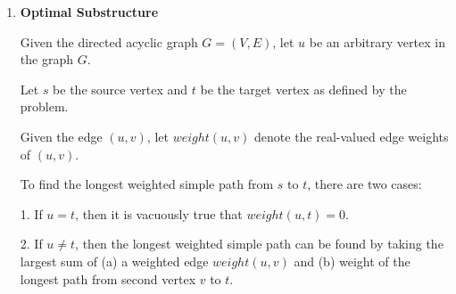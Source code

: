\documentclass[a4paper]{report}
\begin{document}
\begin{enumerate}
      Let $wrap[j]$ be the cost of optimally wrapping words $1\dots j$ (optimally minimized extra spaces).

      If $j=0$, then no words are added so the cost is $0$. This is the base case.

      {\bf Recurrence with base cases}

      Using the notations described above, 

      \begin{displaymath}
        wrap[j] = \left\{
          \begin{array}{lr}
            0  &   \text{ if $j=0$}\\
            min_{1 \leq i \leq j} (cost[i,j] + c[i -1])  &   \text{ if $j > 0$}\\
          \end{array}
          \right.
        \end{displaymath} 



      {\bf Pseudocode: Optimal Value of Objective Function}

      {\it Overview:}

      {\it Time and Space Complexity:}

      {\bf Pseudocode: Optimal Solution}

      {\it Overview:}

      {\it Time and Space Complexity:}



    
    \bigskip
    \setcounter{equation}{0}
    \item 
      {\bf Optimal Substructure}

      Given the directed acyclic graph $G = (V,E)$, let $u$ be an arbitrary vertex in the graph $G$.

      Let $s$ be the source vertex and $t$ be the target vertex as defined by the problem.

      Given the edge $(u,v)$, let $weight(u,v)$ denote the real-valued edge weights of $(u,v)$.

      To find the longest weighted simple path from $s$ to $t$, there are two cases:
      
      1. If $u = t$, then it is vacuously true that $weight(u,t) = 0$.

      2. If $u \neq t$, then the longest weighted simple path can be found by taking the largest sum of
      (a) a weighted edge $weight(u,v)$ and (b) weight of the longest path from second vertex $v$ to $t$.
      

\end{enumerate}
\end{document}
